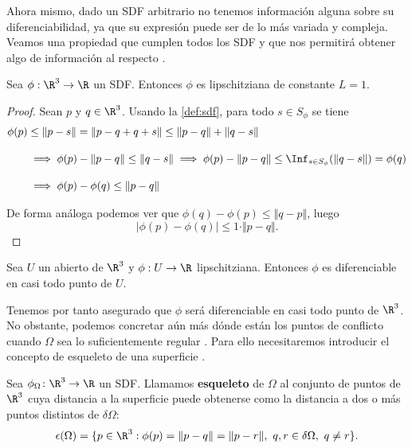 Ahora mismo, dado un SDF arbitrario no tenemos información alguna sobre su diferenciabilidad, ya que su expresión puede ser de lo más variada y compleja. Veamos una propiedad que cumplen todos los SDF y que nos permitirá obtener algo de información al respecto \cite{lips} \cite{derivWiki}.

\begin{lema}
    Sea $\phi:\R^3\to \R$ un SDF. Entonces $\phi$ es lipschitziana de constante $L=1$.
\end{lema}
\begin{proof}
    Sean $p$ y $q\in \R^3$. Usando la \autoref{def:sdf}, para todo $s\in S_{\phi}$ se tiene
    \begin{align*}
        \phi(p) &\le \Vert p-s\Vert = \Vert p-q+q+s\Vert \le \Vert p-q\Vert + \Vert q-s\Vert\\[10pt] 
        &\implies \phi(p) - \Vert p-q\Vert \le \Vert q-s \Vert \implies  \phi(p) - \Vert p-q\Vert \le \Inf_{s\in S_{\phi}}(\Vert q-s \Vert) = \phi(q)\\[10pt]
        &\implies \phi(p) - \phi(q) \le \Vert p-q \Vert
    \end{align*}

    De forma análoga podemos ver que $\phi(q) - \phi(p) \le \Vert q-p \Vert$, luego
    \begin{equation*}
        \vert \phi(p) - \phi(q)\vert \le 1\cdot \Vert p-q\Vert.
    \end{equation*}
\end{proof}

\begin{lema}
    Sea $U$ un abierto de $\R^3$ y $\phi:U\to \R$ lipschitziana. Entonces $\phi$ es diferenciable en casi todo punto de $U$.
\end{lema}

Tenemos por tanto asegurado que $\phi$ será diferenciable en casi todo punto de $\R^3$. No obstante, podemos concretar aún más dónde están los puntos de conflicto cuando $\Omega$ sea lo suficientemente regular \cite{dif1} \cite{dif2}. Para ello necesitaremos introducir el concepto de esqueleto de una superficie \cite{derivWiki}.
\begin{definicion}
    Sea $\phi_{\Omega} \colon \R^3\to \R$ un SDF. Llamamos \textbf{esqueleto} de $\Omega$ al conjunto de puntos de $\R^3$ cuya distancia a la superficie puede obtenerse como la distancia a dos o más puntos distintos de $\delta \Omega$:
    \begin{equation}
        \epsilon(\Omega) = \{p\in \R^3 : \phi(p) = \Vert p-q\Vert = \Vert p-r\Vert,\ q,r\in \delta\Omega ,\ q\neq r \}.
    \end{equation}
\end{definicion}

